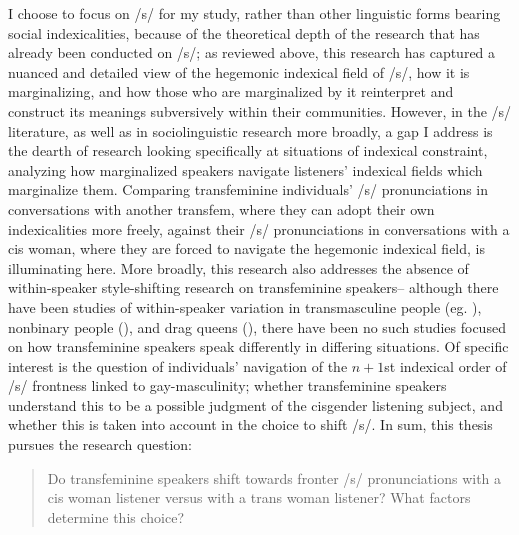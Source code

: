 \documentclass[12pt,twoside]{reedthesis}
\begin{document}
I choose to focus on /s/ for my study, rather than other linguistic forms bearing social indexicalities, because of the theoretical depth of the research that has already been conducted on /s/; as reviewed above, this research has captured a nuanced and detailed view of the hegemonic indexical field of /s/, how it is marginalizing, and how those who are marginalized by it reinterpret and construct its meanings subversively within their communities. However, in the /s/ literature, as well as in sociolinguistic research more broadly, a gap I address is the dearth of research looking specifically at situations of indexical constraint, analyzing how marginalized speakers navigate listeners' indexical fields which marginalize them. Comparing transfeminine individuals' /s/ pronunciations in conversations with another transfem, where they can adopt their own indexicalities more freely, against their /s/ pronunciations in conversations with a cis woman, where they are forced to navigate the hegemonic indexical field, is illuminating here. More broadly, this research also addresses the absence of within-speaker style-shifting research on transfeminine speakers-- although there have been studies of within-speaker variation in transmasculine people (eg. \cite{zimman_variability_2017, parnell-mooney_transgender_2019}), nonbinary people (\cite{gratton_resisting_2016}), and drag queens (\cite{calder_fierceness_2019, mendoza_that_2024}), there have been no such studies focused on how transfeminine speakers speak differently in differing situations. Of specific interest is the question of individuals' navigation of the $n + 1$st indexical order of /s/ frontness linked to gay-masculinity; whether transfeminine speakers understand this to be a possible judgment of the cisgender listening subject, and whether this is taken into account in the choice to shift /s/. In sum, this thesis pursues the research question:
\pagebreak
\begin{quote}
Do transfeminine speakers shift towards fronter /s/ pronunciations with a cis woman listener versus with a trans woman listener? What factors determine this choice?
\end{quote}
\end{document}
